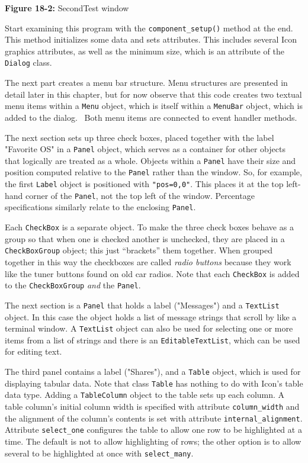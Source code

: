 {\sffamily\bfseries Figure 18-2:}
{\sffamily SecondTest window}

\bigskip

Start examining this program with the \texttt{component\_setup()}
method at the end. This method initializes some data and
sets attributes. This includes several Icon graphics attributes,
as well as the minimum size, which is an attribute of the
\texttt{Dialog} class.

The next part creates a menu bar structure.
Menu structures are presented in detail later in this chapter, but for
now observe that this code creates two textual menu items within a
\texttt{Menu} object, which is itself within a \texttt{MenuBar} object,
which is added to the dialog. \ Both menu items are connected to event
handler methods.

The next section sets up three check boxes,
placed together with the label "Favorite OS" in a \texttt{Panel} object,
which serves as a container for other objects that logically are treated
as a whole. Objects within a \texttt{Panel} have their size and
position computed relative
to the \texttt{Panel} rather than the window. So, for example, the
first \texttt{Label} object is positioned with
\texttt{"pos=0,0"}. This places it at the
top left-hand corner of the \texttt{Panel}, not the top left of the
window. Percentage specifications similarly relate to the enclosing
\texttt{Panel}.

Each \texttt{CheckBox} is a separate object. To make the three check
boxes behave as a group so that when one is checked
another is unchecked, they are placed in a
\texttt{CheckBoxGroup} object; this just
``brackets'' them together. When grouped
together in this way the checkboxes are called \textit{radio buttons} because they work like the
tuner buttons found on old car radios. Note that each
\texttt{CheckBox} is added to the \texttt{CheckBoxGroup} \textit{and}
the \texttt{Panel}.

The next section is a \texttt{Panel} that holds a label
("Messages") and a \texttt{TextList}
object. In this case the object holds a list of message
strings that scroll by like a terminal window. A \texttt{TextList}
object can also be used for selecting one or more items from a list of
strings and there is an \texttt{EditableTextList},
which can be used for editing text.

The third panel contains a label ("Shares"),
and a \texttt{Table} object, which is used for displaying tabular data.
Note that class \texttt{Table} has nothing to do with
Icon's table data type. Adding a \texttt{TableColumn}
object to the table sets up each column. A table column's
initial column width is specified with attribute \texttt{column\_width}
and the alignment of the column's contents is set with
attribute \texttt{internal\_alignment}. Attribute
\texttt{select\_one} configures the table to allow one row to
be highlighted at a time. The default is not to allow highlighting of
rows; the other option is to allow several to be highlighted at once
with \texttt{select\_many}.

